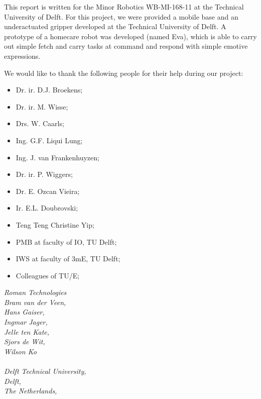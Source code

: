 \documentclass[technical_document.tex]{subfiles}
\begin{document}
This report is written for the Minor Robotics WB-MI-168-11 at the Technical University of Delft. For this project, we were provided a mobile base and an underactuated gripper developed at the Technical University of Delft. A prototype of a homecare robot was developed (named Eva), which is able to carry out simple fetch and carry tasks at command and respond with simple emotive expressions.

We would like to thank the following people for their help during our project:
\begin{itemize}
\item[] Dr. ir. D.J. Broekens;
\item[] Dr. ir. M. Wisse;
\item[] Drs. W. Caarls;
\item[] Ing. G.F. Liqui Lung; 
\item[] Ing. J. van Frankenhuyzen; 
\item[] Dr. ir. P. Wiggers; 
\item[] Dr. E. Ozcan Vieira;
\item[] Ir. E.L. Doubrovski; 
\item[] Teng Teng Christine Yip;
\item[] PMB at faculty of IO, TU Delft;
\item[] IWS at faculty of 3mE, TU Delft;
\item[] Colleagues of TU/E;
\end{itemize}
 

\textit{
Roman Technologies\\
Bram van der Veen,\\
Hans Gaiser,\\
Ingmar Jager,\\
Jelle ten Kate,\\  
Sjors de Wit,\\
Wilson Ko\\\\
Delft Technical University,\\
Delft,\\
The Netherlands,\\
}
\end{document}
